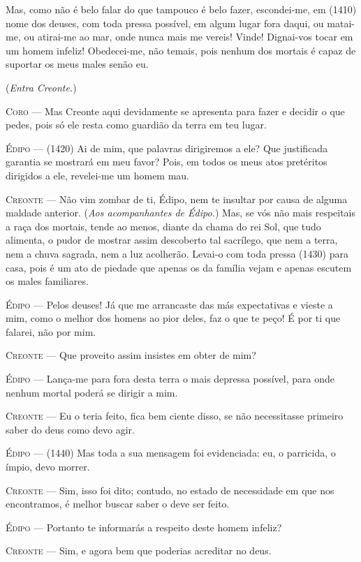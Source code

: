 Mas, como não é belo falar do que tampouco é belo fazer, escondei-me, em
(1410) nome dos deuses, com toda pressa possível, em algum lugar fora
daqui, ou matai-me, ou atirai-me ao mar, onde nunca mais me vereis!
Vinde! Dignai-vos tocar em um homem infeliz! Obedecei-me, não temais,
pois nenhum dos mortais é capaz de suportar os meus males senão eu.

(\emph{Entra Creonte.})

\textsc{Coro} --- Mas Creonte aqui devidamente se apresenta para fazer e decidir o que
pedes, pois só ele resta como guardião da terra em teu lugar.

\textsc{Édipo} --- (1420) Ai de mim, que palavras dirigiremos a ele? Que justificada
garantia se mostrará em meu favor? Pois, em todos os meus atos
pretéritos dirigidos a ele, revelei-me um homem mau.

\textsc{Creonte} --- Não vim zombar de ti, Édipo, nem te insultar por causa de alguma maldade
anterior. (\emph{Aos acompanhantes de Édipo.}) Mas, se vós não mais
respeitais a raça dos mortais, tende ao menos, diante da chama do rei
Sol, que tudo alimenta, o pudor de mostrar assim descoberto tal
sacrílego, que nem a terra, nem a chuva sagrada, nem a luz acolherão.
Levai-o com toda pressa (1430) para casa, pois é um ato de piedade que
apenas os da família vejam e apenas escutem os males familiares.

\textsc{Édipo} --- Pelos deuses! Já que me arrancaste das más expectativas e vieste a mim,
como o melhor dos homens ao pior deles, faz o que te peço! É por ti que
falarei, não por mim.

\textsc{Creonte} --- Que proveito assim insistes em obter de mim?

\textsc{Édipo} --- Lança-me para fora desta terra o mais depressa possível, para onde
nenhum mortal poderá se dirigir a mim.

\textsc{Creonte} --- Eu o teria feito, fica bem ciente disso, se não necessitasse primeiro
saber do deus como devo agir.

\textsc{Édipo} --- (1440) Mas toda a sua mensagem foi evidenciada: eu, o parricida, o
ímpio, devo morrer.

\textsc{Creonte} --- Sim, isso foi dito; contudo, no estado de necessidade em que nos
encontramos, é melhor buscar saber o deve ser feito.

\textsc{Édipo} --- Portanto te informarás a respeito deste homem infeliz?

\textsc{Creonte} --- Sim, e agora bem que poderias acreditar no deus.

